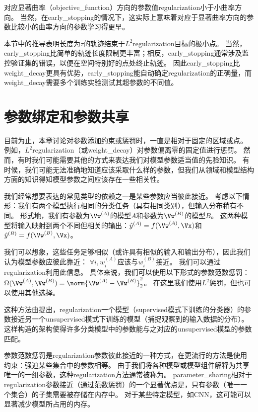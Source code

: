 对应显著曲率（\gls{objective_function}）方向的参数值\gls{regularization}小于小曲率方向。
当然，在\gls{early_stopping}的情况下，这实际上意味着对应于显著曲率方向的参数比较小的曲率方向的参数学习得更早。
 
本节中的推导表明长度为$\tau$的轨迹结束于$L^2$\gls{regularization}目标的极小点。
当然，\gls{early_stopping}比简单的轨迹长度限制更丰富；相反，\gls{early_stopping}通常涉及监控验证集的错误，以便在空间特别好的点处终止轨迹。
因此\gls{early_stopping}比\gls{weight_decay}更具有优势，\gls{early_stopping}能自动确定\gls{regularization}的正确量，而\gls{weight_decay}需要多个训练实验测试其超参数的不同值。


\section{参数绑定和参数共享}
\label{sec:parameter_tying_and_parameter_sharing}
目前为止，本章讨论对参数添加约束或惩罚时，一直是相对于固定的区域或点。
例如，$L^2$\gls{regularization}（或\gls{weight_decay}）对参数偏离零的固定值进行惩罚。
然而，有时我们可能需要其他的方式来表达我们对模型参数适当值的先验知识。
有时候，我们可能无法准确地知道应该采取什么样的参数，但我们从领域和模型结构方面的知识得知模型参数之间应该存在一些相关性。

我们经常想要表达的常见类型的依赖之一是某些参数应当彼此接近。
考虑以下情形：我们有两个模型执行相同的分类任务（具有相同类别），但输入分布稍有不同。
形式地，我们有参数为$\Vw^{(A)}$的模型$A$和参数为$\Vw^{(B)}$的模型$B$。
这两种模型将输入映射到两个不同但相关的输出：$\hat y^{(A)} = f(\Vw^{(A)}, \Vx)$和$\hat y^{(B)} = f(\Vw^{(B)}, \Vx)$。

我们可以想象，这些任务足够相似（或许具有相似的输入和输出分布），因此我们认为模型参数应彼此靠近：
$\forall i, w_i^{(A)}$应该与$ w_i^{(B)}$接近。
我们可以通过\gls{regularization}利用此信息。
具体来说，我们可以使用以下形式的参数范数惩罚：
$\Omega(\Vw^{(A)}, \Vw^{(B)}) = \norm{\Vw^{(A)}-\Vw^{(B)}}_2^2$。
在这里我们使用$L^2$惩罚，但也可以使用其他选择。

这种方法由\cite{LasserreJ2006}提出，\gls{regularization}一个模型（\gls{supervised}模式下训练的分类器）的参数接近另一个\gls{unsupervised}模式下训练的模型（捕捉观察到的输入数据的分布）。
这样构造的架构使得许多分类模型中的参数能与之对应的\gls{unsupervised}模型的参数匹配。

参数范数惩罚是\gls{regularization}参数彼此接近的一种方式，在更流行的方法是使用约束：强迫某些集合中的参数相等。
由于我们将各种模型或模型组件解释为共享唯一的一组参数，这种\gls{regularization}方法通常被称为。
\gls{parameter_sharing}相对于\gls{regularization}参数接近（通过范数惩罚）的一个显著优点是，只有参数（唯一一个集合）的子集需要被存储在内存中。
对于某些特定模型，如\gls{CNN}，这可能可以显著减少模型所占用的内存。



